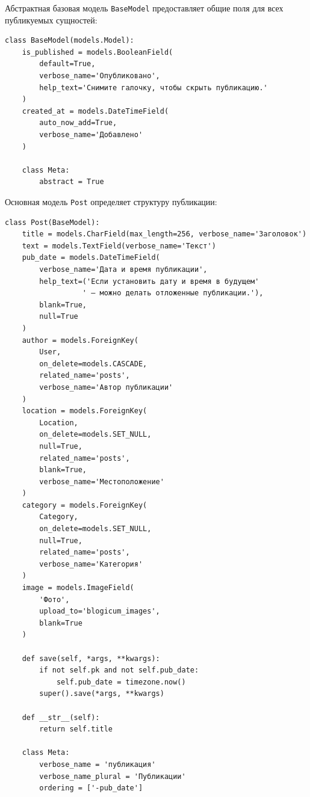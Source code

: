 \documentclass[pract,och,bachelor]{SCWorks}
\begin{document}
Абстрактная базовая модель \texttt{BaseModel} предоставляет общие поля для всех публикуемых сущностей:

\begin{listing}[H]
\begin{verbatim}
class BaseModel(models.Model):
    is_published = models.BooleanField(
        default=True,
        verbose_name='Опубликовано',
        help_text='Снимите галочку, чтобы скрыть публикацию.'
    )
    created_at = models.DateTimeField(
        auto_now_add=True,
        verbose_name='Добавлено'
    )

    class Meta:
        abstract = True
\end{verbatim}
\caption{Абстрактная базовая модель BaseModel}
\end{listing}

Основная модель \texttt{Post} определяет структуру публикации:

\begin{listing}[H]
\begin{verbatim}
class Post(BaseModel):
    title = models.CharField(max_length=256, verbose_name='Заголовок')
    text = models.TextField(verbose_name='Текст')
    pub_date = models.DateTimeField(
        verbose_name='Дата и время публикации',
        help_text=('Если установить дату и время в будущем'
                  ' — можно делать отложенные публикации.'),
        blank=True,
        null=True
    )
    author = models.ForeignKey(
        User,
        on_delete=models.CASCADE,
        related_name='posts',
        verbose_name='Автор публикации'
    )
    location = models.ForeignKey(
        Location,
        on_delete=models.SET_NULL,
        null=True,
        related_name='posts',
        blank=True,
        verbose_name='Местоположение'
    )
    category = models.ForeignKey(
        Category,
        on_delete=models.SET_NULL,
        null=True,
        related_name='posts',
        verbose_name='Категория'
    )
    image = models.ImageField(
        'Фото', 
        upload_to='blogicum_images', 
        blank=True
    )

    def save(self, *args, **kwargs):
        if not self.pk and not self.pub_date:
            self.pub_date = timezone.now()
        super().save(*args, **kwargs)

    def __str__(self):
        return self.title

    class Meta:
        verbose_name = 'публикация'
        verbose_name_plural = 'Публикации'
        ordering = ['-pub_date']
\end{verbatim}
\caption{Модель публикации Post}
\end{listing}
\end{document}
